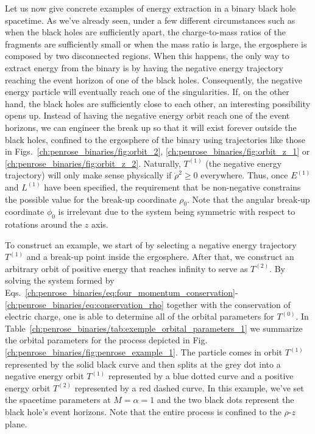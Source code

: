 Let us now give concrete examples of energy extraction in a binary black hole spacetime. As we've already seen, under a few different circumstances such as when the black holes are sufficiently apart, the charge-to-mass ratios of the fragments are sufficiently small or when the mass ratio is large, the ergosphere is composed by two disconnected regions. When this happens, the only way to extract energy from the binary is by having the negative energy trajectory reaching the event horizon of one of the black holes. Consequently, the negative energy particle will eventually reach one of the singularities. If, on the other hand, the black holes are sufficiently close to each other, an interesting possibility opens up. Instead of having the negative energy orbit reach one of the event horizons, we can engineer the break up so that it will exist forever outside the black holes, confined to the ergosphere of the binary using trajectories like those in Figs.~\ref{ch:penrose_binaries/fig:orbit_2}, \ref{ch:penrose_binaries/fig:orbit_z_1} or \ref{ch:penrose_binaries/fig:orbit_z_2}. Naturally, $T^{(1)}$ (the negative energy trajectory) will only make sense physically if $\dot{\rho}^2 \ge 0$ everywhere. Thus, once $E^{(1)}$ and $L^{(1)}$ have been specified, the requirement that\label{ch:penrose_binaries/eq:effective_potential_orbit_equation} be non-negative constrains the possible value for the break-up coordinate $\rho_0$. Note that the angular break-up coordinate $\phi_0$ is irrelevant due to the system being symmetric with respect to rotations around the $z$ axis.

To construct an example, we start of by selecting a negative energy trajectory $T^{(1)}$ and a break-up point inside the ergosphere. After that, we construct an arbitrary orbit of positive energy that reaches infinity to serve as $T^{(2)}$. By solving the system formed by Eqs.~\eqref{ch:penrose_binaries/eq:four_momentum_conservation}-\eqref{ch:penrose_binaries/eq:conservation_rho} together with the conservation of electric charge, one is able to determine all of the orbital parameters for $T^{(0)}$. In Table~\ref{ch:penrose_binaries/tab:exemple_orbital_parameters_1} we summarize the orbital parameters for the process depicted in Fig. \ref{ch:penrose_binaries/fig:penrose_example_1}. The particle comes in orbit $T^{(1)}$ represented by the solid black curve and then splits at the grey dot into a negative energy orbit $T^{(1)}$ represented by a blue dotted curve and a positive energy orbit $T^{(2)}$ represented by a red dashed curve. In this example, we've set the spacetime parameters at $M = \alpha = 1$ and the two black dots represent the black hole's event horizons. Note that the entire process is confined to the $\rho$-$z$ plane.

